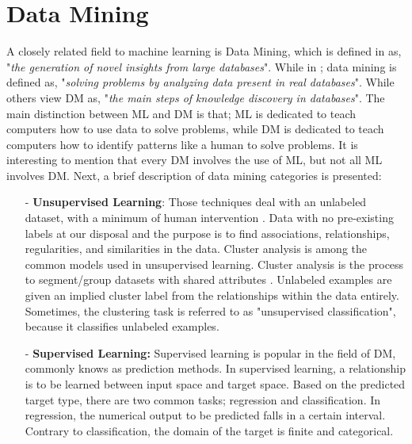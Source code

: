 %
%
\section{Data Mining}
\label{sec:2_2_SML}
A closely related field to machine learning is Data Mining, which is defined in \cite{lantz2013} as, "\textit{the generation of novel insights from large databases}". While in \cite{garcia2015}; data mining is defined as, "\textit{solving problems by analyzing data present in real databases}". While others \cite{chakrabarti2006,han2011,nisbet2009,clifton2010} view DM as, "\textit{the main steps of knowledge discovery in databases}". The main distinction between ML and DM is that; ML is dedicated to teach computers how to use data to solve problems, while DM is dedicated to teach computers how to identify patterns like a human to solve problems. It is interesting to mention that every DM involves the use of ML, but not all ML involves DM. Next, a brief description of data mining categories is presented:
 
\begin{itemize}
    \item [-] \textbf{Unsupervised Learning}: Those techniques deal with an unlabeled dataset, with a minimum of human intervention \cite{fisher2014}. Data with no pre-existing labels at our disposal and the purpose is to find associations, relationships, regularities, and similarities in the data. Cluster analysis is among the common models used in unsupervised learning. Cluster analysis is the process to segment/group datasets with shared attributes \cite{kaufman2009}. Unlabeled examples are given an implied cluster label from the relationships within the data entirely. Sometimes, the clustering task is referred to as "unsupervised classification", because it classifies unlabeled examples.   
    
    
\item[-] \textbf{Supervised Learning:}   Supervised learning is popular in the field of DM, commonly knows as prediction methods. In supervised learning, a relationship is to be learned between input space and target space. Based on the predicted target type, there are two common tasks; regression and classification. In regression, the numerical output to be predicted falls in a certain interval. Contrary to classification, the domain of the target is finite and categorical.   
\end{itemize}

